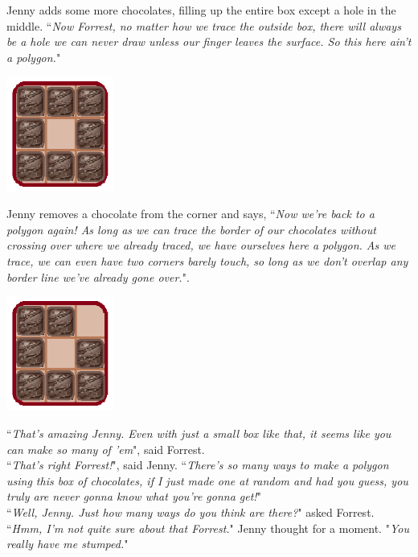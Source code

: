 Jenny adds some more chocolates, filling up the entire box except a hole in the middle. ``\textit{Now Forrest, no matter how we trace the outside box, there will always be a hole we can never draw unless our finger leaves the surface. So this here ain't a polygon.}"

\begin{center}\includegraphics[width=100pt]{chocolates3.png}\end{center}

Jenny removes a chocolate from the corner and says, ``\textit{Now we're back to a polygon again! As long as we can trace the border of our chocolates without crossing over where we already traced, we have ourselves here a polygon. As we trace, we can even have two corners barely touch, so long as we don't overlap any border line we've already gone over.}".

\begin{center}\includegraphics[width=100pt]{chocolates4.png}\end{center}

``\textit{That's amazing Jenny. Even with just a small box like that, it seems like you can make so many of 'em}", said Forrest.\\

``\textit{That's right Forrest!}", said Jenny. ``\textit{There's so many ways to make a polygon using this box of chocolates, if I just made one at random and had you guess, you truly are never gonna know what you're gonna get!}"\\

``\textit{Well, Jenny. Just how many ways do you think are there?}" asked Forrest.\\

``\textit{Hmm, I'm not quite sure about that Forrest.}" Jenny thought for a moment. "\textit{You really have me stumped.}"\\

